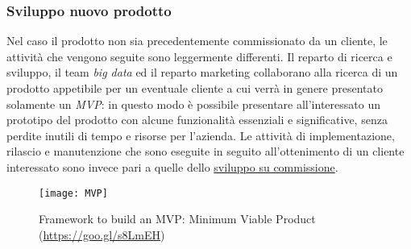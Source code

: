 \subsubsection{Sviluppo nuovo prodotto}
Nel caso il prodotto non sia precedentemente commissionato da un cliente, le attività che vengono seguite sono leggermente differenti. Il reparto di ricerca e sviluppo, il team \textit{big data} ed il reparto marketing collaborano alla ricerca di un prodotto appetibile per un eventuale cliente a cui verrà in genere presentato solamente un \textit{\gls{MVP}}: in questo modo è possibile presentare all'interessato un prototipo del prodotto con alcune funzionalità essenziali e significative, senza perdite inutili di tempo e risorse per l'azienda. Le attività di implementazione, rilascio e manutenzione che sono eseguite in seguito all'ottenimento di un cliente interessato sono invece pari a quelle dello \hyperref[commissione]{sviluppo su commissione}.
\begin{figure}[!h] 
	\centering 
	\texttt{[image: MVP]}
	\caption{Framework to build an MVP: Minimum Viable Product (\href{https://goo.gl/s8LmEH}{https://goo.gl/s8LmEH})}
\end{figure}

